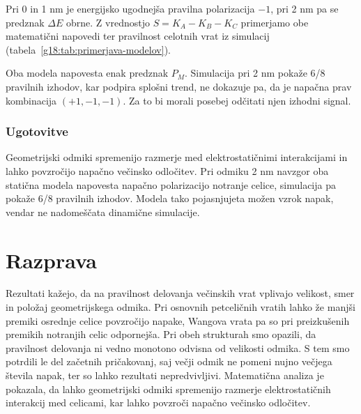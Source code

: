 \documentclass[12pt,a4paper]{article}
\begin{document}
Pri 0 in 1 nm je energijsko ugodnejša pravilna polarizacija $-1$, pri 2 nm pa se predznak $\Delta E$ obrne. Z vrednostjo $S=K_A-K_B-K_C$ primerjamo obe matematični napovedi ter pravilnost celotnih vrat iz simulacij (tabela~\ref{g18:tab:primerjava-modelov}).

\begin{table}[H]
    \centering
    \caption{Primerjava matematičnih napovedi za vhodno kombinacijo $(+1,-1,-1)$ in števila pravilnih izhodnih kombinacij v simulaciji.}
    \label{g18:tab:primerjava-modelov}
    \small
\end{table}

Oba modela napovesta enak predznak $P_M$. Simulacija pri 2 nm pokaže 6/8 pravilnih izhodov, kar podpira splošni trend, ne dokazuje pa, da je napačna prav kombinacija $(+1,-1,-1)$. Za to bi morali posebej odčitati njen izhodni signal.

\subsubsection{Ugotovitve}
\label{g18:sec:energijske-ugotovitve}
Geometrijski odmiki spremenijo razmerje med elektrostatičnimi interakcijami in lahko povzročijo napačno večinsko odločitev. Pri odmiku 2 nm navzgor oba statična modela napovesta napačno polarizacijo notranje celice, simulacija pa pokaže 6/8 pravilnih izhodov. Modela tako pojasnjujeta možen vzrok napak, vendar ne nadomeščata dinamične simulacije.

\newpage


\section{Razprava}
\label{g18:sec:razprava}

Rezultati kažejo, da na pravilnost delovanja večinskih vrat vplivajo velikost, smer in položaj geometrijskega odmika.
Pri osnovnih petceličnih vratih lahko že manjši premiki osrednje celice povzročijo napake, Wangova vrata pa so
pri preizkušenih premikih notranjih celic odpornejša. Pri obeh strukturah smo opazili, da pravilnost delovanja
ni vedno monotono odvisna od velikosti odmika. 
S tem smo potrdili le del začetnih pričakovanj, saj večji odmik ne pomeni nujno večjega števila napak, ter so lahko rezultati nepredvivljivi.
Matematična analiza je pokazala, da lahko geometrijski odmiki spremenijo razmerje elektrostatičnih interakcij med celicami, kar lahko povzroči napačno večinsko odločitev.
\end{document}
